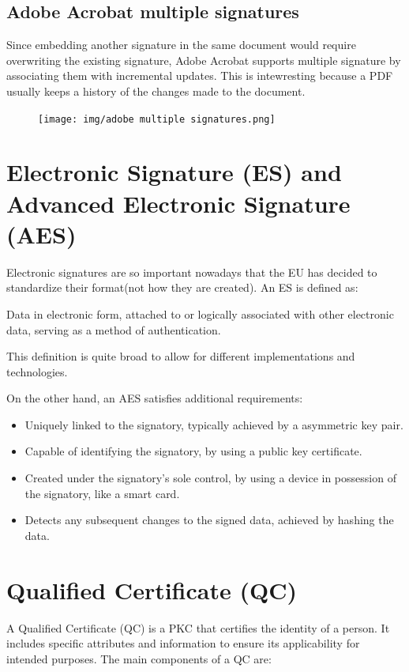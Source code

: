 \subsection{Adobe Acrobat multiple signatures}
Since embedding another signature in the same document would require
overwriting the existing signature, Adobe Acrobat supports multiple
signature by associating them with incremental updates. This is
intewresting because a PDF usually keeps a history of the changes made 
to the document.

\begin{figure}
  \centering
  \texttt{[image: img/adobe multiple
  signatures.png]}

\end{figure}

\section{Electronic Signature (ES) and Advanced Electronic Signature
(AES)}
Electronic signatures are so important nowadays that the EU has
decided to standardize their format(not how they are created).
An ES is defined as:
\begin{boxH}
    Data in electronic form, attached to or logically associated with
    other electronic data, serving as a method of authentication.
\end{boxH}
This definition is quite broad to allow for different implementations 
and technologies.

On the other hand, an AES satisfies additional requirements:
\begin{itemize}
    \item Uniquely linked to the signatory, typically achieved by a
      asymmetric key pair.
    \item Capable of identifying the signatory, by using a public key
      certificate.
    \item Created under the signatory's sole control, by using a
      device in possession of the signatory, like a smart card.
    \item Detects any subsequent changes to the signed data, achieved
      by hashing the data.
\end{itemize}

\section{Qualified Certificate (QC)}
A Qualified Certificate (QC) is a PKC that certifies the identity of a
person. It includes specific attributes and information to ensure its
applicability for intended purposes. The main components of a QC are:

